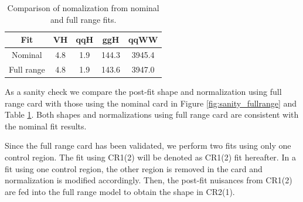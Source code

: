 %
\begin{table}
\begin{center}
\begin{tabular}{c|cccc}
\hline
Fit         & VH    & qqH   & ggH   & qqWW          \\
\hline
Nominal     & 4.8   & 1.9   & 144.3 &  3945.4       \\
Full range  & 4.8   & 1.9   & 143.6 &  3947.0       \\
\hline
\end{tabular}
\end{center}
\caption{Comparison of nomalization from nominal and full range fits.} 
\label{tab:sanity_fullrange}
\end{table}
As a sanity check we compare the post-fit shape and normalization 
using full range card with those using the nominal card in Figure \ref{fig:sanity_fullrange} and 
Table \ref{tab:sanity_fullrange}. Both shapes and normalizations using full range card 
are consistent with the nominal fit results. 

Since the full range card has been validated, we perform two fits using only one control region.
The fit using CR1(2) will be denoted as CR1(2) fit hereafter. In a fit using one control region, 
the other region is removed in the card and normalization is modified accordingly.
Then, the post-fit nuisances from CR1(2) are fed into the full range model to obtain the 
shape in CR2(1).  

